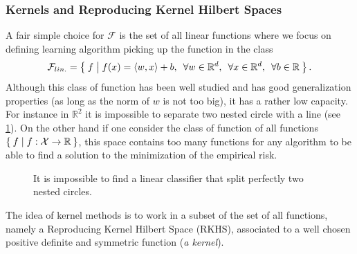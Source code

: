 \subsubsection{Kernels and Reproducing Kernel Hilbert Spaces}
A fair simple choice for $\mathcal{F}$ is the set of all linear functions where
we focus on defining learning algorithm picking up the  function in
the class
\begin{dmath*}
    \mathcal{F}_{lin.} = \Set{f | f(x) = \inner{w, x} + b, \enskip \forall w \in
    \mathbb{R}^d, \enskip \forall x \in \mathbb{R}^d, \enskip \forall b \in
    \mathbb{R}}.
\end{dmath*}
Although this class of function has been well studied and has good
generalization properties (as long as the norm of $w$ is not too big), it has a
rather low capacity.  For instance in $\mathbb{R}^2$ it is impossible to
separate two nested circle with a line (see \cref{fig:nested_circle}). On the
other hand if one consider the class of function of all functions $\Set{f |
f:\mathcal{X}\to\mathbb{R}}$, this space contains too many functions for any
algorithm to be able to find a solution to the minimization of the empirical
risk.
\begin{figure}
    \centering
    \caption[Separation of nested circles with linear classifier]{It is
    impossible to find a linear classifier that split perfectly two nested
    circles.}
    \label{fig:nested_circle}
\end{figure}
The idea of kernel methods \citep{Aronszajn1950,KIMELDORF1971,Boser1992, Berlinet2003,Shawe-TaylorBook} is to work in a 
subset of the set of all functions, namely a Reproducing Kernel Hilbert Space (\acl{RKHS}), associated to a well chosen positive definite and symmetric function ({\it a kernel}).

